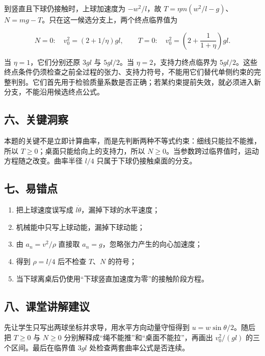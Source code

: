 \documentclass[12pt,a4paper,UTF8]{ctexart}
\newcommand{\tightlist}{\setlength{\itemsep}{0pt}\setlength{\parskip}{0pt}}
\begin{document}
到竖直且下球仍接触时，上球加速度为 \(-w^2/l\)，故
\(T=\eta m(w^2/l-g)\)、\(N=mg-T\)。只在这一候选分支上，两个终点临界值为

\[N=0:\quad v_0^2=(2+1/\eta)gl,\qquad T=0:\quad v_0^2=\left(2+\frac1{1+\eta}\right)gl.\]

当 \(\eta=1\)，它们分别还原 \(3gl\) 与 \(5gl/2\)。当
\(\eta=2\)，支持力终点临界为
\(5gl/2\)。这些终点条件仍须检查之前全过程的张力、支持力符号，不能用它们替代单侧约束的完整判别。它们首先用于检验质量系数是否正确；若某约束提前失效，就必须进入新分支，不能沿用候选终点公式。

\subsection{六、关键洞察}\label{ux516dux5173ux952eux6d1eux5bdf}

本题的关键不是立即计算曲率，而是先判断两种不等式约束：细线只能拉不能推，所以
\(T\geq0\)；桌面只能给向上的支持力，所以
\(N\geq0\)。当参数跨过临界值时，运动方程随之改变。曲率半径 \(l/4\)
只属于下球仍接触桌面的分支。

\subsection{七、易错点}\label{ux4e03ux6613ux9519ux70b9}

\begin{enumerate}
\def\labelenumi{\arabic{enumi}.}
\tightlist
\item
  把上球速度误写成 \(l\dot\theta\)，漏掉下球的水平速度；
\item
  机械能中只写上球动能，漏掉下球动能；
\item
  由 \(a_n=v^2/\rho\) 直接取 \(a_n=g\)，忽略张力产生的向心加速度；
\item
  得到 \(\rho=l/4\) 后不检查 \(T\)、\(N\) 的符号；
\item
  当下球离桌后仍使用``下球竖直加速度为零''的接触阶段方程。
\end{enumerate}

\subsection{八、课堂讲解建议}\label{ux516bux8bfeux5802ux8bb2ux89e3ux5efaux8bae}

先让学生只写出两球坐标并求导，用水平方向动量守恒得到
\(u=w\sin\theta/2\)。随后把 \(T\geq0\) 与 \(N\geq0\)
分别解释成``绳不能推''和``桌面不能拉''，再画出 \(v_0^2/(gl)\)
的三个区间。最后在临界值 \(3gl\) 处检查两套曲率公式是否连续。
\end{document}

